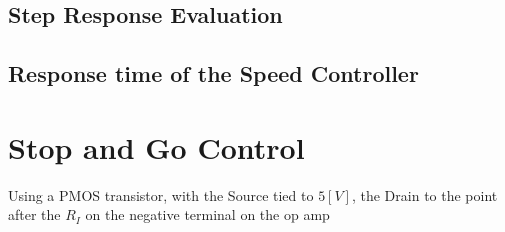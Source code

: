 \documentclass{hw}
\begin{document}
\subsection{Step Response Evaluation}
\subsection{Response time of the Speed Controller}
\section{Stop and Go Control}
Using a PMOS transistor, with the Source tied to $5[V]$, the Drain to the point
after the $R_I$ on the negative terminal on the op amp
\end{document}
